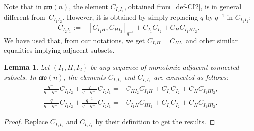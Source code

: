 \documentclass[10pt,a4paper]{amsart}
\numberwithin{equation}{section}
\newtheorem{lemm}[theo]{Lemma}
\theoremstyle{definition}
\newcommand{\aw}{\mathfrak{aw}(n)}
\begin{document}
Note that in $\aw$, the element $C_{I_2I_1}$, obtained from~\eqref{def-CI2}, is in general different from~$C_{I_1I_2}$. However, it
is obtained by simply replacing $q$ by $q^{-1}$ in $C_{I_1I_2}$:
\begin{equation*}%
C_{I_2I_1}:=-[C_{I_1H},C_{HI_2}]_{q^{-1}}+{C_{I_1}C_{I_2}}+C_{H}C_{I_1HI_2}.
\end{equation*}
We have used that, from our notations, we get $C_{I_1H}=C_{HI_1}$ and other similar equalities implying adjacent subsets.

\begin{lemm} Let $(I_1,H,I_2)$ be any sequence of monotonic adjacent connected subsets. In $\aw$, the elements $C_{I_1I_2}$ and $C_{I_2I_1}$ are connected as follows:
\begin{subequations}\label{eq:C13C31}
\begin{align}
&\frac{q^{-1}}{q+q^{-1}}C_{I_1I_2} +\frac{q}{q+q^{-1}}C_{I_2I_1}= -C_{HI_2}C_{I_1H}+ C_{I_1}C_{I_2}+C_HC_{I_1HI_2},\\
& \frac{q}{q+q^{-1}}C_{I_1I_2}+\frac{q^{-1}}{q+q^{-1}}C_{I_2I_1}= -C_{I_1H}C_{HI_2}+ C_{I_1}C_{I_2}+C_HC_{I_1HI_2}.
\end{align}
\end{subequations}
\end{lemm}
\begin{proof} Replace $C_{I_1I_2}$ and $C_{I_2I_1}$ by their definition to get the results. \end{proof}
\end{document}
